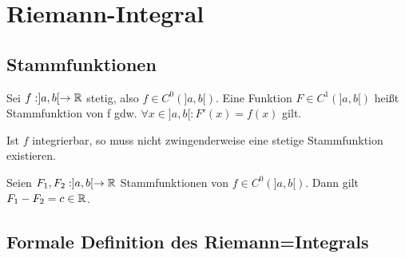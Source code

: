 \chapter{Riemann-Integral}





\section{Stammfunktionen}
\begin{definition}

Sei $f:]a,b[\rightarrow\mathbb{R}$ stetig, also $f\in C^0(]a,b[)$.
Eine Funktion $F\in C^1(]a,b[)$ heißt Stammfunktion von f gdw. $\forall x\in ]a,b[: F'(x)=f(x)$ gilt.
\end{definition}

\begin{remark}
Ist $f$ integrierbar, so muss nicht zwingenderweise eine stetige Stammfunktion existieren.
\end{remark}

\begin{theorem}[Konstante]
Seien $F_1, F_2: ]a,b[\rightarrow \mathbb{R}$ Stammfunktionen von $f\in C^0(]a,b[)$. Dann gilt $F_1-F_2 = c\in\mathbb{R}$.
\end{theorem}

\section{Formale Definition des Riemann=Integrals}


